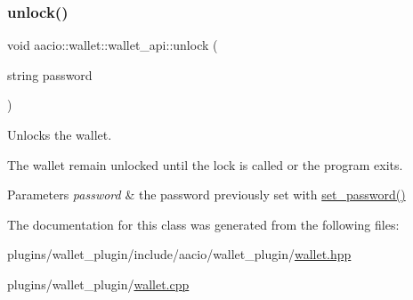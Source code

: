 \subsubsection{\texorpdfstring{unlock()}{unlock()}}
{\footnotesize\ttfamily void aacio\+::wallet\+::wallet\+\_\+api\+::unlock (\begin{DoxyParamCaption}\item[{string}]{password }\end{DoxyParamCaption})}

Unlocks the wallet.

The wallet remain unlocked until the {\ttfamily lock} is called or the program exits. 
\begin{DoxyParams}{Parameters}
{\em password} & the password previously set with {\ttfamily \mbox{\hyperlink{classaacio_1_1wallet_1_1wallet__api_a9b9c6db62baab3c4f2476823573d57ce}{set\+\_\+password()}}} \\
\hline
\end{DoxyParams}


The documentation for this class was generated from the following files\+:\begin{DoxyCompactItemize}
\item 
plugins/wallet\+\_\+plugin/include/aacio/wallet\+\_\+plugin/\mbox{\hyperlink{wallet_8hpp}{wallet.\+hpp}}\item 
plugins/wallet\+\_\+plugin/\mbox{\hyperlink{wallet_8cpp}{wallet.\+cpp}}\end{DoxyCompactItemize}

